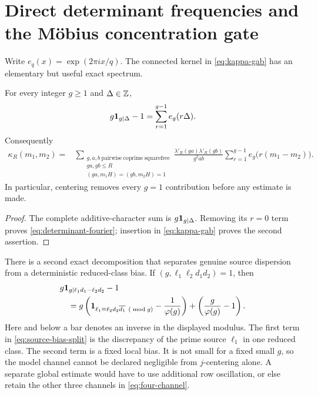 \section{Direct determinant frequencies and the M\"obius concentration gate}
\label{sec:direct-frequency}

Write \(e_q(x)=\exp(2\pi i x/q)\).  The connected kernel in
\cref{eq:kappa-gab} has an elementary but useful exact spectrum.

\begin{proposition}
\label{prop:determinant-fourier}
For every integer \(g\ge1\) and \(\Delta\in\mathbb Z\),
\begin{equation}
 g\mathbf 1_{g\mid\Delta}-1
 =\sum_{r=1}^{g-1}e_g(r\Delta).
 \label{eq:determinant-fourier}
\end{equation}
Consequently
\begin{align}
 \kappa_R(m_1,m_2)
 ={}&\sum_{\substack{g,a,b\ \mathrm{pairwise\ coprime\ squarefree}\\
 ga,gb\le R\\(ga,m_1H)=(gb,m_2H)=1}}
 \frac{\lambda'_R(ga)\lambda'_R(gb)}{g^2ab}
 \sum_{r=1}^{g-1}e_g\!\bigl(r(m_1-m_2)\bigr).
 \label{eq:kappa-direct-spectrum}
\end{align}
In particular, centering removes every \(g=1\) contribution before
any estimate is made.
\end{proposition}

\begin{proof}
The complete additive-character sum is \(g\mathbf 1_{g\mid\Delta}\).
Removing its \(r=0\) term proves \eqref{eq:determinant-fourier}; insertion
in \eqref{eq:kappa-gab} proves the second assertion.
\end{proof}

There is a second exact decomposition that separates genuine source
dispersion from a deterministic reduced-class bias.  If
\((g,\ell_1\ell_2d_1d_2)=1\), then
\begin{align}
 &g\mathbf 1_{g\mid \ell_1d_1-\ell_2d_2}-1
 \notag\\
 &\quad={}
 g\left(
 \mathbf 1_{\ell_1\equiv \ell_2d_2\overline{d_1}\ (\bmod g)}
 -\frac1{\varphi(g)}
 \right)
 +\left(\frac g{\varphi(g)}-1\right).
 \label{eq:source-bias-split}
\end{align}
Here and below a bar denotes an inverse in the displayed modulus.  The
first term in \eqref{eq:source-bias-split} is the discrepancy of the
prime source \(\ell_1\) in one reduced class.  The second term is a
fixed local bias.  It is not small for a fixed small \(g\), so the
model channel cannot be declared negligible from \(j\)-centering
alone.  A separate global estimate would have to use additional row
oscillation, or else retain the other three channels in
\eqref{eq:four-channel}.

